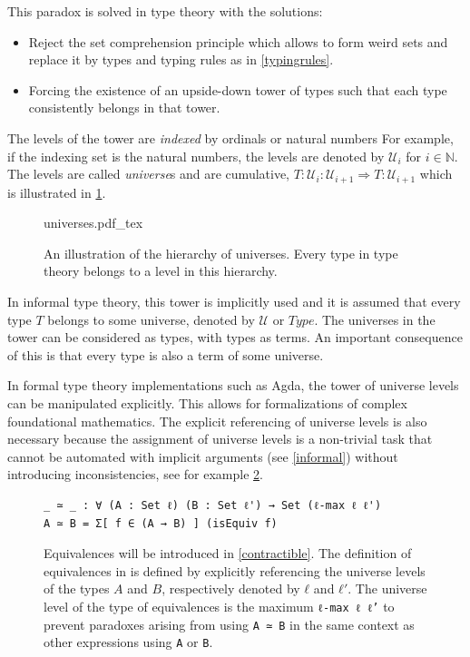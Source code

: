 \documentclass[12pt,a4paper,twoside,xetex]{book} %
\newcommand{\keyword}[1]{\emph{#1}\index{#1}}
\newcommand{\incfig}[1]{%
    \def\svgwidth{0.6\columnwidth}
    {#1.pdf_tex}
}
\begin{document}
This paradox is solved in type theory with the solutions:

\begin{itemize}
 \item Reject the set comprehension principle which allows to form weird sets and replace it by types and typing rules as in \cref{typingrules}.
 \item  Forcing the existence of an upside-down tower of types such that each type consistently belongs in that tower. 
 
\end{itemize}
 
The levels of the 
tower are \keyword{indexed} by ordinals or natural numbers For example, if the indexing set is the natural numbers, the levels are denoted by $\mathcal{U}_i$ for $i\in \mathbb{N}$. The levels are called \keyword{universe}s and are cumulative, $T: 
\mathcal{U}_i:\mathcal{U}_{i+1} \Rightarrow T : \mathcal{U}_{i+1}$ which is illustrated in \cref{universefig}.

\begin{figure}\label{universefig}
\centering
\incfig{universes}
\caption{An illustration of the hierarchy of universes. Every type in type theory belongs to a level in this hierarchy.}
\end{figure}



In informal type theory, this tower is implicitly used and it is assumed that 
every type $T$ belongs to some universe, denoted by $\mathcal{U}$ or $Type$. The 
universes in the tower can be considered as types, with types as terms. An 
important consequence of this is that every type is also a term of some 
universe.

In formal type theory implementations such as Agda, the tower of universe levels 
can be manipulated explicitly. This allows for formalizations of 
complex foundational mathematics. The explicit referencing of universe levels is also necessary because the 
assignment of universe levels is a non-trivial task that cannot be automated with implicit arguments (see \cref{informal})
without introducing inconsistencies, see for example \cref{AgdaEquivalences}.

\begin{figure}\label{AgdaEquivalences}
\centering
\begin{BVerbatim}
_ ≃ _ : ∀ (A : Set ℓ) (B : Set ℓ') → Set (ℓ-max ℓ ℓ')
A ≃ B = Σ[ f ∈ (A → B) ] (isEquiv f)
\end{BVerbatim}

\caption{Equivalences will be introduced in \cref{contractible}. The definition 
of equivalences in \cite{Moertberg2018} is defined by explicitly referencing the 
universe levels of the types $A$ and $B$, respectively denoted by $ℓ$ and $ℓ'$. 
The universe level of the type of equivalences is the maximum \texttt{ℓ-max ℓ ℓ'} 
to prevent paradoxes arising from using \texttt{A ≃ B} in the same context as 
other expressions using \texttt{A} or \texttt{B}.}
\end{figure}
\end{document}
